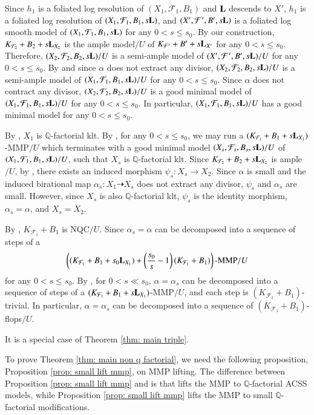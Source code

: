 \documentclass[preprint,12pt]{elsarticle}
\newcommand{\Qq}{\mathbb{Q}}
\newcommand{\Ff}{\mathcal{F}}
\newcommand{\Ll}{{\bf{L}}}
\begin{document}
\begin{pf}
Since $h_1$ is a foliated log resolution of $(X_1,\Ff_1,B_1)$ and $\Ll$ descends to $X'$, $h_1$ is a foliated log resolution of $(X_1,\Ff_1,B_1,s\Ll)$, and $(X',\Ff',B',s\Ll)$ is a foliated log smooth model of $(X_1,\Ff_1,B_1,s\Ll)$ for any $0<s\leq s_0$. By our construction, $K_{\Ff_2}+B_2+s\Ll_{X_2}$ is the ample model$/U$ of $K_{\Ff'}+B'+s\Ll_{X'}$ for any $0<s\leq s_0$. Therefore, $(X_2,\Ff_2,B_2,s\Ll)/U$ is a semi-ample model of $(X',\Ff',B',s\Ll)/U$ for any $0<s\leq s_0$. By \cite[Lemma A.28]{LMX24b} and since $\alpha$ does not extract any divisor, $(X_2,\Ff_2,B_2,s\Ll)/U$ is a semi-ample model of $(X_1,\Ff_1,B_1,s\Ll)/U$ for any $0<s\leq s_0$. Since $\alpha$ does not contract any divisor, $(X_2,\Ff_2,B_2,s\Ll)/U$ is a good minimal model of $(X_1,\Ff_1,B_1,s\Ll)/U$ for any $0<s\leq s_0$. In particular,  $(X_1,\Ff_1,B_1,s\Ll)/U$ has a good minimal model for any $0<s\leq s_0$. 

By \cite[Theorem 7.2]{LMX24b}, $X_1$ is $\Qq$-factorial klt. By \cite[Theorem A.13]{LMX24b}, for any $0<s\leq s_0$, we may run a $(K_{\Ff_1}+B_1+s\Ll_{X_1})$-MMP$/U$ which terminates with a good minimal model $(X_s,\Ff_s,B_s,s\Ll)/U$ of $(X_1,\Ff_1,B_1,s\Ll)/U$, such that $X_s$ is $\Qq$-factorial klt. Since $K_{\Ff_2}+B_2+s\Ll_{X_2}$ is ample$/U$, by \cite[Lemma A.25]{LMX24b}, there exists an induced morphism $\psi_s: X_s\rightarrow X_2$. Since $\alpha$ is small and the induced birational map $\alpha_s: X_1\dashrightarrow X_s$ does not extract any divisor, $\psi_s$ and $\alpha_s$ are small. However, since $X_s$ is also $\Qq$-factorial klt, $\psi_s$ is the identity morphism, $\alpha_s=\alpha$, and $X_s=X_2$.

By \cite[Theorem 1.12]{LMX24b}, $K_{\Ff_1}+B_1$ is NQC$/U$. Since $\alpha_s=\alpha$ can be decomposed into a sequence of steps of a
$$\left((K_{\Ff_1}+B_1+s_0\Ll_{X_1})+\left(\frac{s_0}{s}-1\right)(K_{\Ff_1}+B_1)\right)\text{-MMP}/U$$
for any $0<s\leq s_0$. By \cite[Lemma B.6]{LMX24b}, for $0 <s \ll s_0$, $\alpha=\alpha_s$ can be decomposed into a sequence of steps of a $(K_{\Ff_1}+B_1+s\Ll_{X_1})$-MMP$/U$, and each step is $(K_{\Ff_1}+B_1)$-trivial. In particular, $\alpha=\alpha_s$ can be decomposed into a sequence of $(K_{\Ff_1}+B_1)$-flops$/U$.
\end{pf}

\begin{pf}
    It is a special case of Theorem \ref{thm: main triple}.
\end{pf}

To prove Theorem \ref{thm: main non q factorial}, we need the following proposition, Proposition \ref{prop: small lift mmp}, on MMP lifting. The difference between  Proposition \ref{prop: small lift mmp} and \cite[Proposition 8.2]{LMX24b} is that \cite[Proposition 8.2]{LMX24b} lifts the MMP to $\Qq$-factorial ACSS models, while  Proposition \ref{prop: small lift mmp} lifts the MMP to small $\Qq$-factorial modifications. 
\end{document}
